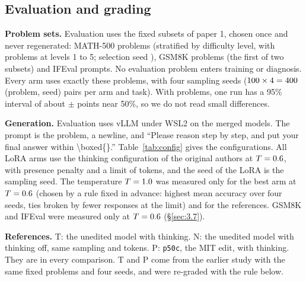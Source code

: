 \documentclass[11pt]{article}
\newcommand{\fitwidth}[1]{\resizebox{\ifdim\width>\linewidth\linewidth\else\width\fi}{!}{#1}}
\begin{document}
\subsection{Evaluation and grading}\label{sec:3.5}

\textbf{Problem sets.} Evaluation uses the fixed subsets of paper 1, chosen once and never regenerated: \NMath{} MATH-500 problems (stratified by difficulty level, with \MathLevels{} problems at levels 1 to 5; selection seed \MathSubsetSeed{}), \NGsm{} GSM8K problems (the first of two subsets) and \NIfeval{} IFEval prompts. No evaluation problem enters training or diagnosis. Every arm uses exactly these problems, with four sampling seeds ($100 \times 4 = 400$ (problem, seed) pairs per arm and task). With \NMath{} problems, one run has a 95\% interval of about $\pm$\WilsonHalf{} points near 50\%, so we do not read small differences.

\textbf{Generation.} Evaluation uses vLLM under WSL2 on the merged models. The prompt is the problem, a newline, and ``Please reason step by step, and put your final answer within \textbackslash{}boxed\{\}.'' Table~\ref{tab:config} gives the configurations. All LoRA arms use the thinking configuration of the original authors at $T=0.6$, with presence penalty \PresencePenalty{} and a limit of \MaxTokensEval{} tokens, and the seed of the LoRA is the sampling seed. The temperature $T=1.0$ was measured only for the best arm at $T=0.6$ (chosen by a rule fixed in advance: highest mean accuracy over four seeds, ties broken by fewer responses at the limit) and for the references. GSM8K and IFEval were measured only at $T=0.6$ (\S\ref{sec:3.7}).

\begin{table}[htbp]
\centering
\caption{Generation configurations. Each configuration differs from the original thinking configuration only in the mode or the stated parameter. The third row is the no-thinking profile of the original authors; it appears in paper 1 and is listed here for completeness. Source: \texttt{scripts/comun\_math.py}.}\label{tab:config}
\footnotesize\setlength{\tabcolsep}{4pt}
\fitwidth{}
\end{table}

\textbf{References.} T: the unedited model with thinking. N: the unedited model with thinking off, same sampling and \MaxTokensEval{} tokens. P: \texttt{p50c}, the MIT edit, with thinking. They are in every comparison. T and P come from the earlier study with the same fixed problems and four seeds, and were re-graded with the rule below.
\end{document}
